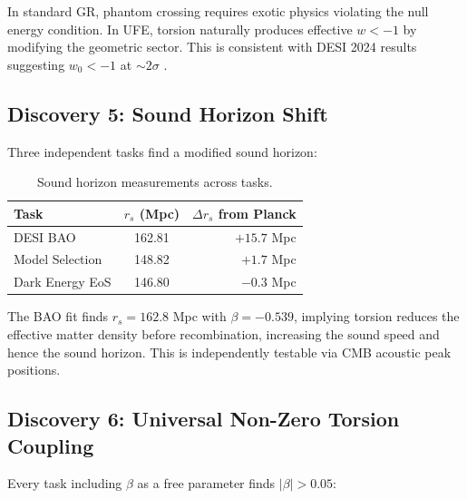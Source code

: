 \documentclass[twocolumn,prd,superscriptaddress,nofootinbib]{revtex4-2}
\begin{document}
In standard GR, phantom crossing requires exotic physics violating the null energy condition. In UFE, torsion naturally produces effective $w < -1$ by modifying the geometric sector. This is consistent with DESI 2024 results suggesting $w_0 < -1$ at $\sim 2\sigma$ \cite{DESI2024}.

\subsection{Discovery 5: Sound Horizon Shift}

Three independent tasks find a modified sound horizon:

\begin{table}[h]
\caption{Sound horizon measurements across tasks.}
\label{tab:rs}
\begin{ruledtabular}
\begin{tabular}{lcr}
Task & $r_s$ (Mpc) & $\Delta r_s$ from Planck \\
\hline
DESI BAO & 162.81 & $+15.7$ Mpc \\
Model Selection & 148.82 & $+1.7$ Mpc \\
Dark Energy EoS & 146.80 & $-0.3$ Mpc \\
\end{tabular}
\end{ruledtabular}
\end{table}

The BAO fit finds $r_s = 162.8$ Mpc with $\beta = -0.539$, implying torsion reduces the effective matter density before recombination, increasing the sound speed and hence the sound horizon. This is independently testable via CMB acoustic peak positions.

\subsection{Discovery 6: Universal Non-Zero Torsion Coupling}

Every task including $\beta$ as a free parameter finds $|\beta| > 0.05$:
\end{document}
